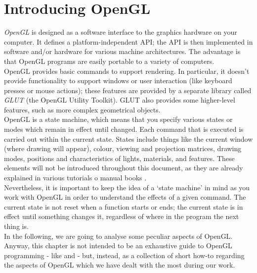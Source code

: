 \setcounter{figure}{0}
\setcounter{table}{0}
\setcounter{lstlisting}{0}

\chapter{Introducing OpenGL}
\label{opengl}
\minitoc

\textit{OpenGL} is designed as a software interface to the graphics 
hardware on your computer. It defines a platform-independent API;
the API is then implemented in software and/or hardware for 
various machine architectures. The advantage is that OpenGL 
programs are easily portable to a variety of computers.
\\
OpenGL provides basic commands to support rendering. 
In particular, it doesn't provide functionality to support
windows or user interaction (like keyboard presses or mouse 
actions); these features are provided by a separate library called
\textit{GLUT} (the OpenGL Utility Toolkit). GLUT also provides some 
higher-level features, such as more complex geometrical objects.
\\
OpenGL is a state machine, which means that you specify various 
states or modes which remain in effect until changed.
Each command that is executed is carried out within the current 
state. States include things like the current window (where
drawing will appear), colour, viewing and projection matrices, 
drawing modes, positions and characteristics of lights,
materials, and features. These elements will not be introduced 
throughout this document, as they are already explained in
various tutorials \cite{opengl:brieftutorial} o manual books 
\cite{opengl:redbook}.
\\
Nevertheless, it is important to keep the idea of a 
`state machine' in mind as you work with OpenGL in order to 
understand the effects of a given command. The current state 
is not reset when a function starts or ends; the current state
is in effect until something changes it, regardless of where 
in the program the next thing is. 
\\
In the following, we are going to analyse some peculiar 
aspects of OpenGL. Anyway, this chapter is not intended 
to be an exhaustive guide to OpenGL programming 
- like \cite{opengl:distilled} and \cite{opengl:redbook} - but,
instead, as a collection of short how-to regarding the 
aspects of OpenGL which we have dealt with the most 
during our work. 

\clearpage

\clearpage

\clearpage

\clearpage

